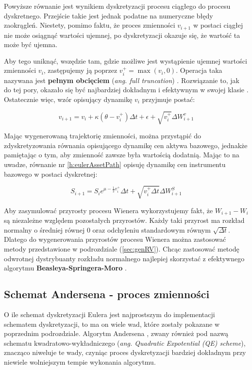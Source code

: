 \documentclass{pracamgr}
\begin{document}
Powyższe równanie jest wynikiem dyskretyzacji procesu ciągłego do procesu dyskretnego. Przejście
takie jest jednak podatne na numeryczne błędy zaokrągleń. Niestety, pomimo faktu, że 
proces zmienności $v_{i+1}$ w postaci ciągłej nie może osiągnąć wartości ujemnej, po 
dyskretyzacji okazuje się, że wartość ta może być ujemna. 

Aby tego uniknąć, wszędzie tam, gdzie możliwe jest wystąpienie ujemnej 
wartości zmienności $v_i$, zastępujemy ją poprzez $v_i^+ = \max(v_i, 0)$. Operacja taka nazywana jest 
\textbf{pełnym obcięciem} (\textit{ang. full truncation}) \cite{Lord}.
Rozwiązanie to, jak do tej pory, okazało się być najbardziej dokładnym i 
efektywnym w swojej klasie \cite{Malham}. Ostatecznie więc, wzór opisujący dynamikę $v_i$ przyjmuje 
postać:

\begin{equation}\label{h:eulerNonZero}
v_{i+1}  = v_i + \kappa (\theta - v_i^+) \Delta t + \epsilon +  \sqrt{v_i^+} \Delta W^{v}_{i+1}
\end{equation}

Mając wygenerowaną trajektorię zmienności, można przystąpić do zdyskretyzowania równania opisującego 
dynamikę cen aktywa bazowego, jednakże pamiętając o tym, aby zmienność zawsze była wartością 
dodatnią. 
Mając to na uwadze, równanie nr \ref{h:eulerAssetPath} opisuję dynamikę cen instrumentu bazowego w 
postaci dyskretnej:

\begin{equation}\label{h:eulerAssetPath}
S_{i+1} = S_i e^{\mu - \frac{1}{2} v_i^+} \Delta t + \sqrt{v_i^+ \Delta t}  \Delta W_{i+1}^S
\end{equation}
  
Aby zasymulować przyrosty procesu Wienera wykorzystujemy fakt, że $W_{i+1}  - W_{i}$ są niezależne 
względem pozostałych przyrostów. 
Każdy taki przyrost ma rozkład normalny o średniej równej $0$ oraz odchyleniu standardowym 
równym $\sqrt{\Delta t}$. 
Dlatego do wygenerowania przyrostów procesu Wienera można zastosować metody przedstawione w 
podrozdziale (\ref{sec:genRV}). Chcąc zastosować metodę odwrotnej dystrybuanty rozkładu normalnego 
najlepiej skorzystać z efektywnego algorytmu \textbf{Beasleya-Springera-Moro} \cite{Glasserman}.


\subsection{Schemat Andersena - proces zmienności}
\label{sec:algorytm_andersena}
O ile schemat dyskretyzacji Eulera jest najprostszym do implementacji schematem dyskretyzacji, to ma 
on wiele wad, które zostały pokazane w poprzednim podrozdziale.
Algorytm Andersena \cite{Andersen}, zwany również pod nazwą schematu 
kwadratowo-wykładniczego (\textit{ang. Quadratic Expotential (QE) scheme}),
znacząco niweluje te wady, czyniąc proces dyskretyzacji bardziej dokładnym przy niewiele wolniejszym 
tempie wykonania algorytmu. 
\end{document}
